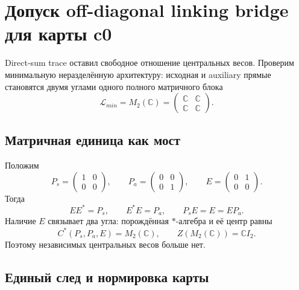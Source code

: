 \chapter{Допуск off-diagonal linking bridge для карты c0}
\label{ch:v8-baryon-c0-linking-algebra-offdiagonal-bridge-admission-gate}

Direct-sum trace оставил свободное отношение центральных весов. Проверим
минимальную неразделённую архитектуру: исходная и auxiliary прямые становятся
двумя углами одного полного матричного блока
\begin{equation}
 \mathcal L_{min}=M_2(\mathbb C)=
 \begin{pmatrix}
 \mathbb C&\mathbb C\\
 \mathbb C&\mathbb C
 \end{pmatrix}.
 \label{eq:v8-baryon-c0-minimal-linking-algebra}
\end{equation}

\section{Матричная единица как мост}

Положим
\begin{equation}
 P_s=\begin{pmatrix}1&0\\0&0\end{pmatrix},
 \qquad
 P_a=\begin{pmatrix}0&0\\0&1\end{pmatrix},
 \qquad
 E=\begin{pmatrix}0&1\\0&0\end{pmatrix}.
 \label{eq:v8-baryon-c0-linking-matrix-units}
\end{equation}
Тогда
\begin{equation}
 EE^*=P_s,
 \qquad E^*E=P_a,
 \qquad P_sE=E=EP_a.
 \label{eq:v8-baryon-c0-linking-imprimitivity-relations}
\end{equation}
Наличие $E$ связывает два угла: порождённая $*$-алгебра и её центр равны
\begin{equation}
 C^*(P_s,P_a,E)=M_2(\mathbb C),
 \qquad Z(M_2(\mathbb C))=\mathbb C I_2.
 \label{eq:v8-baryon-c0-linking-generated-simple-block}
\end{equation}
Поэтому независимых центральных весов больше нет.

\section{Единый след и нормировка карты}

